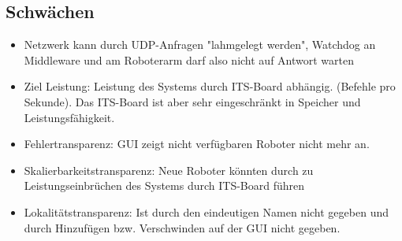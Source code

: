 \subsection*{Schwächen}
\begin{itemize}
	\item Netzwerk kann durch UDP-Anfragen "lahmgelegt werden", Watchdog an Middleware und am Roboterarm darf also nicht auf Antwort warten
	\item Ziel Leistung: Leistung des Systems durch ITS-Board abhängig. (Befehle pro Sekunde). Das ITS-Board ist aber sehr eingeschränkt in Speicher und Leistungsfähigkeit.
	\item Fehlertransparenz: GUI zeigt nicht verfügbaren Roboter nicht mehr an.
	\item Skalierbarkeitstransparenz: Neue Roboter könnten durch zu Leistungseinbrüchen des Systems durch ITS-Board führen
	\item Lokalitätstransparenz: Ist durch den eindeutigen Namen nicht gegeben und durch Hinzufügen bzw. Verschwinden auf der GUI nicht gegeben.
\end{itemize}



